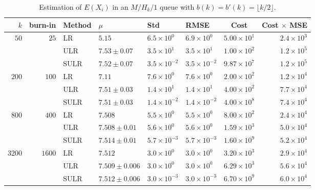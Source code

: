 \documentclass[a4paper,11pt]{article}
\begin{document}
\begin{table}
\caption{Estimation of \(E(X_{i})\) in an \(M/H_{k}/1\) queue with  \(b(k)=b'(k)=\lfloor k/2\rfloor\).}
\begin{small}
\begin{tabular}{rrllllcr}\hline
$k$ &  burn-in & Method   & $\mu$  & Std & RMSE & Cost& Cost $\times$ MSE \\ \hline
$50$&$25 $&LR & $5.15$ & $6.5\times10^0$ & $6.9\times10^0$ & $5.00\times10^1$ & $2.4\times10^3$\\
& &ULR & $7.53 \pm 0.07$ & $3.5\times10^1$ & $3.5\times10^1$ & $1.00\times10^2$ & $1.2\times10^5$\\
& &SULR & $7.52 \pm 0.07$ & $3.5\times10^{-2}$ & $3.5\times10^{-2}$ & $9.87\times10^7$ & $1.2\times10^5$\\
$200$&$100 $&LR & $7.11$ & $7.6\times10^0$ & $7.6\times10^0$ & $2.00\times10^2$ & $1.2\times10^4$\\
& &ULR & $7.51 \pm 0.03$ & $1.4\times10^1$ & $1.4\times10^1$ & $4.00\times10^2$ & $7.7\times10^4$\\
& &SULR & $7.51 \pm 0.03$ & $1.4\times10^{-2}$ & $1.4\times10^{-2}$ & $4.00\times10^8$ & $7.4\times10^4$\\
$800$&$400 $&LR & $7.508$ & $5.5\times10^0$ & $5.5\times10^0$ & $8.00\times10^2$ & $2.4\times10^4$\\
& &ULR & $7.508 \pm 0.01$ & $5.6\times10^0$ & $5.6\times10^0$ & $1.59\times10^3$ & $5.0\times10^4$\\
& &SULR & $7.514 \pm 0.01$ & $5.7\times10^{-3}$ & $5.7\times10^{-3}$ & $1.60\times10^9$ & $5.2\times10^4$\\
$3200$&$1600 $&LR & $7.512$ & $3.0\times10^0$ & $3.0\times10^0$ & $3.20\times10^3$ & $2.9\times10^4$\\
& &ULR & $7.509 \pm 0.006$ & $3.0\times10^0$ & $3.0\times10^0$ & $6.29\times10^3$ & $5.6\times10^4$\\
& &SULR & $7.512 \pm 0.006$ & $3.0\times10^{-3}$ & $3.0\times10^{-3}$ & $6.70\times10^9$ & $6.0\times10^4$\\
\hline\end{tabular}
 \end{small}
\label{tab:MH0.5}
\end{table}
\end{document}
